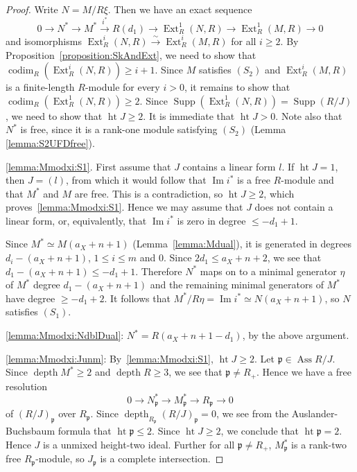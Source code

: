 \documentclass[11pt,a4paper]{amsart}
\theoremstyle{plain}
\theoremstyle{definition}
\newcommand{\frakp}{{\mathfrak p}}
\DeclareMathOperator{\height}{ht}
\DeclareMathOperator{\codim}{codim}
\DeclareMathOperator{\Supp}{Supp}
\DeclareMathOperator{\depth}{depth}
\DeclareMathOperator{\image}{Im}
\DeclareMathOperator{\Ass}{Ass}
\DeclareMathOperator{\Ext}{Ext}
\begin{document}
\begin{proof}
%
Write $N=M/R\xi$. Then we have an exact sequence
\[
0 \to N^* \to M^* \stackrel{i^*}\to R(d_1) \to \Ext^1_R(N,R) \to 
\Ext^1_R(M,R) \to 0
\]
and isomorphisms $\Ext^i_R(N,R) \stackrel\sim\to \Ext^i_R(M,R)$ for all $i
\geq 2$.
By Proposition~\ref{proposition:SkAndExt}, we need to show that 
$\codim_R(\Ext_R^i(N,R)) \geq i+1$.
Since $M$ satisfies $(S_2)$ and 
$\Ext_R^i(M,R )$ is a finite-length $R$-module for every $i>0$, 
it remains to show that $\codim_R(\Ext_R^1(N,R)) \geq 2$.
Since $\displaystyle\Supp \left(\Ext_R^1(N,R) \right ) = \Supp (R/J)$, we
need to show that $\height J \geq 2$.
It is immediate that $\height J >0$.
Note also that $N^*$ is free, since it is a rank-one module satisfying
$(S_2)$ (Lemma \ref{lemma:S2UFDfree}).

\eqref{lemma:Mmodxi:S1}. First assume that $J$ contains a linear form $l$.
If $\height J = 1$, then $J = (l)$, from which it would follow that
$\image i^*$ is a free $R$-module and that $M^*$ and $M$ are free.
This is a contradiction, so $\height J \geq 2$, which
proves~\eqref{lemma:Mmodxi:S1}.
Hence we may assume that $J$ does not contain a linear form, or,
equivalently, that $\image i^*$ is zero in degree $\leq -d_1+1$.

Since $M^* \simeq M(a_X +n + 1)$ (Lemma~\ref{lemma:Mdual}),
it is generated in degrees
$d_i - (a_X + n + 1)$, $1 \leq i \leq m$ and $0$.
Since $2d_1 \leq a_X + n + 2$, we see that
$d_1 - (a_X + n + 1) \leq -d_1+1$.
Therefore $N^*$ maps on to a minimal generator $\eta$ of $M^*$ degree 
$d_1 - (a_X + n + 1)$ and the remaining minimal generators of $M^*$ 
have degree $\geq -d_1+2$. 
It follows that 
$M^*/R\eta = \image i^* \simeq N(a_X+n+1)$, so $N$ satisfies $(S_1)$.

\eqref{lemma:Mmodxi:NdblDual}:
$N^* = R(a_X+n+1-d_1)$, by the above argument. 

\eqref{lemma:Mmodxi:Junm}:
By~\eqref{lemma:Mmodxi:S1}, $\height J \geq 2$.
Let $\frakp \in \Ass R/J$. 
Since $\depth M^* \geq 2$ and $\depth R \geq 3$, 
we see that $\frakp \neq R_+$.
Hence we have a free resolution
\[
0 \to N_\frakp^* \to M_\frakp^* \to R_\frakp \to  0
\]
of $(R/J)_{\frakp}$ over $R_\frakp$. Since $\depth_{R_\frakp } 
(R/J)_{\frakp} = 0$, we see from the Auslander-Buchsbaum formula that
$\height \frakp \leq 2$. Since $\height J \geq 2$, we conclude that
$\height \frakp = 2$. Hence $J$ is a unmixed height-two ideal.
Further for all $\frakp \neq R_+$, $M_\frakp^*$ is a rank-two free
$R_\frakp$-module, so $J_\frakp$ is a complete intersection.
\end{proof}
\end{document}
